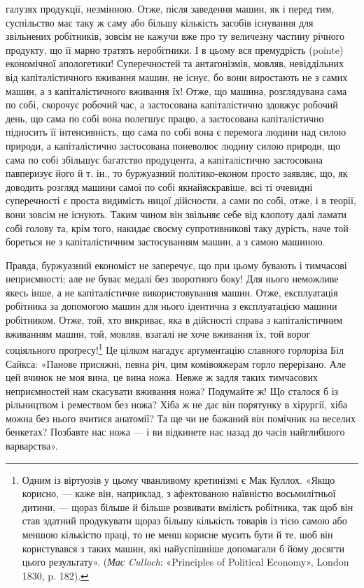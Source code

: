 \parcont{}  %
галузях продукції, незмінною. Отже, після заведення машин,
як і перед тим, суспільство має таку ж саму або більшу кількість
засобів існування для звільнених робітників, зовсім не кажучи
вже про ту величезну частину річного продукту, що її марно
тратять неробітники. І в цьому вся премудрість (pointe) економічної
апологетики! Суперечностей та антагонізмів, мовляв, невіддільних
від капіталістичного вживання машин, не існує, бо
вони виростають не з самих машин, а з капіталістичного вживання
їх! Отже, що машина, розглядувана сама по собі, скорочує
робочий час, а застосована капіталістично здовжує робочий день,
що сама по собі вона полегшує працю, а застосована капіталістично
підносить її інтенсивність, що сама по собі вона є перемога
людини над силою природи, а капіталістично застосована
поневолює людину силою природи, що сама по собі збільшує багатство
продуцента, а капіталістично застосована павперизує
його й т. ін., то буржуазний політико-економ просто заявляє,
що, як доводить розгляд машини самої по собі якнайяскравіше,
всі ті очевидні суперечності є проста видимість ницої дійсности,
а сами по собі, отже, і в теорії, вони зовсім не існують. Таким чином
він звільняє себе від клопоту далі ламати собі голову та,
крім того, накидає своєму супротивникові таку дурість, наче той
бореться не з капіталістичним застосуванням машин, а з самою
машиною.

Правда, буржуазний економіст не заперечує, що при цьому
бувають і тимчасові неприємності; але не буває медалі без зворотного
боку! Для нього неможливе якесь інше, а не капіталістичне
використовування машин. Отже, експлуатація робітника за допомогою
машин для нього ідентична з експлуатацією машини робітником.
Отже, той, хто викриває, яка в дійсності справа з капіталістичним
вживанням машин, той, мовляв, взагалі не хоче вживання
їх, той ворог соціяльного проґресу!\footnote{
Одним із віртуозів у цьому чванливому кретинізмі є Мак Куллох.
«Якщо корисно, — каже він, наприклад, з афектованою наївністю
восьмилітньої дитини, — щораз більше й більше розвивати вмілість робітника,
так щоб він став здатний продукувати щораз більшу кількість товарів
із тією самою або меншою кількістю праці, то не менш корисне мусить
бути й те, шоб він користувався з таких машин, які найуспішніше допомагали
б йому досягти цього результату». (\emph{Мас Culloch}: «Principles
of Political Economy», London 1830, p. 182).
} Це цілком нагадує
арґументацію славного горлоріза Біл Сайкса: «Панове присяжні,
певна річ, цим комівояжерам горло перерізано. Але цей вчинок
не моя вина, це вина ножа. Невже ж задля таких тимчасових
неприємностей нам скасувати вживання ножа? Подумайте ж!
Що сталося б із рільництвом і ремеством без ножа? Хіба ж не
дає він порятунку в хірургії, хіба можна без нього вчитися анатомії?
Та ще чи не бажаний він помічник на веселих бенкетах?
Позбавте нас ножа — і ви відкинете нас назад до часів найглибшого
варварства».

